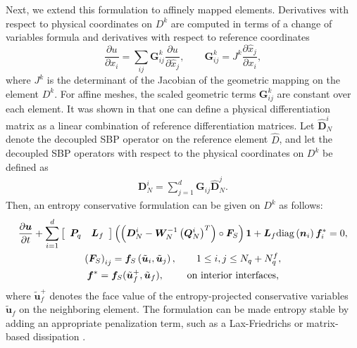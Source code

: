 \documentclass[review]{siamart0216}
\theoremstyle{assumption}
\renewcommand{\hat}[1]{\widehat{#1}}
\newcommand{\pd}[2]{\frac{\partial#1}{\partial#2}}
\newcommand{\LRp}[1]{\left( #1 \right)}
\newcommand{\LRs}[1]{\left[ #1 \right]}
\newcommand{\diag}[1]{{\rm diag}\LRp{#1}}
\begin{document}
Next, we extend this formulation to affinely mapped elements.  Derivatives with respect to physical coordinates on $D^k$ are computed in terms of a change of variables formula and derivatives with respect to reference coordinates 
\[
\pd{u}{x_i} = \sum_{ij} \bm{G}^k_{ij}\pd{u}{\hat{x}_j}, \qquad \bm{G}^k_{ij} = J^k\pd{\hat{x}_j}{{x}_i}, 
\]
where $J^k$ is the determinant of the Jacobian of the geometric mapping on the element $D^k$.
For affine meshes, the scaled geometric terms $\bm{G}^k_{ij}$ are constant over each element.  It was shown in \cite{chan2017discretely} that one can define a physical differentiation matrix as a linear combination of reference differentiation matrices.  Let $\hat{\bm{D}}^i_N$ denote the decoupled SBP operator on the reference element $\hat{D}$, and let the decoupled SBP operators with respect to the physical coordinates on $D^k$ be defined as
\begin{align}
{\bm{D}}^i_N = \sum_{j=1}^d \bm{G}_{ij}\hat{\bm{D}}^j_N.
\end{align}
Then, an entropy conservative formulation can be given on $D^k$ as follows:
\begin{gather}
\pd{\bm{u}}{t} + \sum_{i=1}^d \LRs{\begin{array}{cc}
\bm{P}_q & \bm{L}_f\end{array}} \LRp{\LRp{\bm{D}^i_N - \bm{W}_N^{-1}\LRp{\bm{Q}^i_N}^T} \circ \bm{F}_S}\bm{1} + \bm{L}_f \diag{{\bm{n}_i}}\bm{f}_i^* = 0, \label{eq:skewform}\\
\LRp{\bm{F}_S}_{ij} = \bm{f}_S\LRp{\tilde{\bm{u}}_i,\tilde{\bm{u}}_j}, \qquad 1\leq i,j\leq N_q + N^f_q, \nonumber\\
\bm{f}^* = \bm{f}_S(\tilde{\bm{u}}_f^+,\tilde{\bm{u}}_f), \qquad \text{ on interior interfaces,} \nonumber
\end{gather}
where $\tilde{\bm{u}}_f^+$ denotes the face value of the entropy-projected conservative variables $\tilde{\bm{u}}_f$ on the neighboring element.  The formulation can be made entropy stable by adding an appropriate penalization term, such as a Lax-Friedrichs or matrix-based dissipation \cite{winters2017uniquely, chen2017entropy, chan2017discretely}.  
\end{document}
